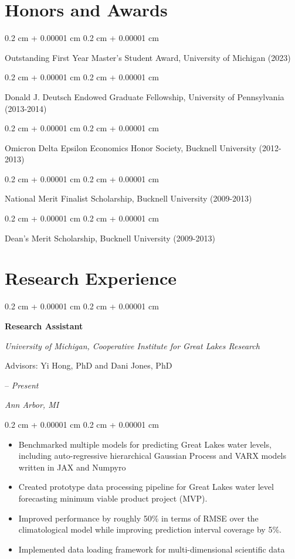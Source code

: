 \documentclass[11pt, letterpaper]{article}
\newenvironment{highlights}{
    \begin{itemize}[
        topsep=0.10 cm,
        parsep=0.10 cm,
        partopsep=0pt,
        itemsep=0pt,
        leftmargin=0.4 cm + 10pt
    ]
}{
    \end{itemize}
} %
\newenvironment{onecolentry}{
    \begin{adjustwidth}{
        0.2 cm + 0.00001 cm
    }{
        0.2 cm + 0.00001 cm
    }
}{
    \end{adjustwidth}
} %
\newenvironment{twocolentry}[2][]{
    \onecolentry
    \def\secondColumn{#2}
    \setcolumnwidth{\fill, 4.5 cm}
    \begin{paracol}{2}
}{
    \switchcolumn \raggedleft \secondColumn
    \end{paracol}
    \endonecolentry
} %
\begin{document}
\section{Honors and Awards}

\begin{onecolentry}
    Outstanding First Year Master's Student Award, University of Michigan (2023)
\end{onecolentry}
\begin{onecolentry}
    Donald J. Deutsch Endowed Graduate Fellowship, University of Pennsylvania (2013-2014)
\end{onecolentry}
\begin{onecolentry}
    Omicron Delta Epsilon Economics Honor Society, Bucknell University (2012-2013)
\end{onecolentry}
\begin{onecolentry}
    National Merit Finalist Scholarship, Bucknell University (2009-2013)
\end{onecolentry}
\begin{onecolentry}
    Dean's Merit Scholarship, Bucknell University (2009-2013)
\end{onecolentry}

\section{Research Experience}

\begin{twocolentry}{2023 – \textit{Present}

        \textit{Ann Arbor, MI}
    }

    \textbf{Research Assistant}

    \textit{University of Michigan, Cooperative Institute for Great Lakes Research}

    Advisors: Yi Hong, PhD and Dani Jones, PhD
\end{twocolentry}

\vspace{0.05 cm}
\begin{onecolentry}
    \begin{highlights}
        \item Benchmarked multiple models for predicting Great Lakes water levels, including auto-regressive hierarchical Gaussian Process and VARX models written in JAX and Numpyro
        \item Created prototype data processing pipeline for Great Lakes water level forecasting minimum viable product project (MVP).
        \item Improved performance by roughly 50\% in terms of RMSE over the climatological model while improving prediction interval coverage by 5\%.
        \item Implemented data loading framework for multi-dimensional scientific data
    \end{highlights}
\end{onecolentry}
\end{document}
